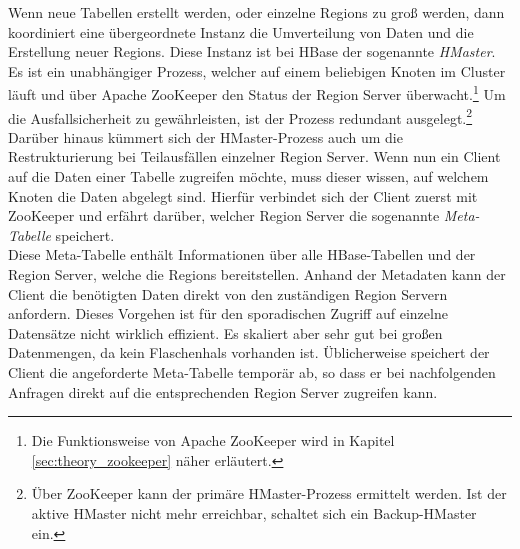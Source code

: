 \noindent
Wenn neue Tabellen erstellt werden, oder einzelne Regions zu groß werden, dann koordiniert eine übergeordnete Instanz die Umverteilung von Daten und die Erstellung neuer Regions. Diese Instanz ist bei HBase der sogenannte \textit{HMaster}. Es ist ein unabhängiger Prozess, welcher auf einem beliebigen Knoten im Cluster läuft und über Apache ZooKeeper den Status der Region Server überwacht.\footnote{Die Funktionsweise von Apache ZooKeeper wird in Kapitel \ref{sec:theory_zookeeper} näher erläutert.} Um die Ausfallsicherheit zu gewährleisten, ist der Prozess redundant ausgelegt.\footnote{Über ZooKeeper kann der primäre HMaster-Prozess ermittelt werden. Ist der aktive HMaster nicht mehr erreichbar, schaltet sich ein Backup-HMaster ein.} Darüber hinaus kümmert sich der HMaster-Prozess auch um die Restrukturierung bei Teilausfällen einzelner Region Server.
Wenn nun ein Client auf die Daten einer Tabelle zugreifen möchte, muss dieser wissen, auf welchem Knoten die Daten abgelegt sind. Hierfür verbindet sich der Client zuerst mit ZooKeeper und erfährt darüber, welcher Region Server die sogenannte \textit{Meta-Tabelle} speichert.\cite[S. 579]{hadoop_definitive_guide}\\
Diese Meta-Tabelle enthält Informationen über alle HBase-Tabellen und der Region Server, welche die Regions bereitstellen. Anhand der Metadaten kann der Client die benötigten Daten direkt von den zuständigen Region Servern anfordern.
Dieses Vorgehen ist für den sporadischen Zugriff auf einzelne Datensätze nicht wirklich effizient. Es skaliert aber sehr gut bei großen Datenmengen, da kein Flaschenhals vorhanden ist. Üblicherweise speichert der Client die angeforderte Meta-Tabelle temporär ab, so dass er bei nachfolgenden Anfragen direkt auf die entsprechenden Region Server zugreifen kann.\\ 

